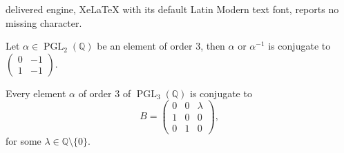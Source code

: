 \documentclass[10pt,a4paper]{amsart}
\DeclareMathOperator{\PGL}{PGL}
\newcommand{\Q}{\ensuremath{\mathbb{Q} }}
\begin{document}
delivered engine, XeLaTeX with its default Latin Modern text font, reports no missing character.
\begin{lem}\label{element:O3P2}
    Let $\alpha\in\PGL_2(\Q)$ be an element of order $3$, then $\alpha$ or $\alpha^{-1}$ is conjugate to $\left(\begin{matrix}
       0&-1\\1&-1 
    \end{matrix}\right)$.
\end{lem}

\begin{lem}\label{lemm-29}
Every element $\alpha$ of order $3$ of $\PGL _3(\Q )$ is conjugate to \[B=\left(\begin{matrix}
       0&0  & \lambda \\
          1&0  &0\\
           0&1 &0
    \end{matrix}\right),\]
    for some $\lambda\in\Q \setminus\{0\}$.
\end{lem}
\end{document}
